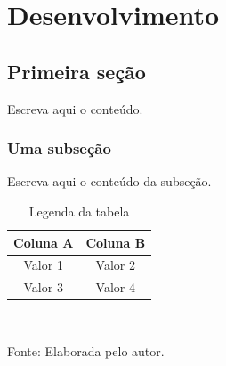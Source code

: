 \chapter{Desenvolvimento}
\label{cap:desenvolvimento}


\section{Primeira seção}
\label{sec:primeira}
Escreva aqui o conteúdo.

\subsection{Uma subseção}
Escreva aqui o conteúdo da subseção.

\begin{table}[htb]
	\centering
	\caption{Legenda da tabela}
	\label{tab:exemplo}
	\begin{tabular}{cc}
		\toprule
		Coluna A & Coluna B \\
		\midrule
		Valor 1  & Valor 2  \\
		Valor 3  & Valor 4  \\
		\bottomrule
	\end{tabular}
	\\[4pt]
	\begin{flushleft}
		Fonte: Elaborada pelo autor.
	\end{flushleft}
\end{table}


